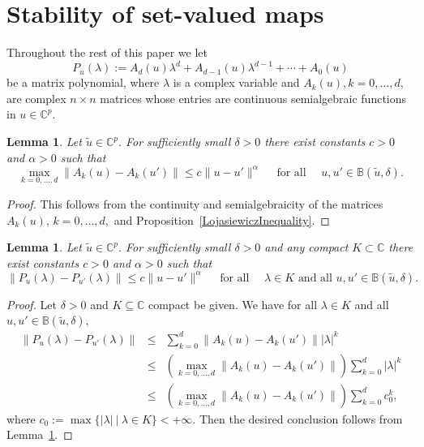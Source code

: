 \documentclass[10pt,reqno]{amsart}
\theoremstyle{break-italic}
\theoremstyle{break-italic}
\theoremstyle{break-italic}
\theoremstyle{break-italic}
\theoremstyle{break-italic}
\theoremstyle{break-italic}
\theoremstyle{break-italic}
\theoremstyle{break-italic}
\newtheorem{lemma}[satz]{Lemma}
\theoremstyle{break-roman}
\theoremstyle{standard}
\theoremstyle{varthm-roman}
\theoremstyle{varthm-italic}
\theoremstyle{varthm-roman-break}
\theoremstyle{varthm-italic-break}
\theoremstyle{varthm-roman-no-punctuation}
\theoremstyle{varthm-italic-no-punctuation}
\numberwithin{equation}{section}
\begin{document}
\section{Stability of set-valued maps} \label{Section-Stability}

Throughout the rest of this paper we let
$$P_{u}(\lambda) := A_d(u) \lambda^d  + A_{d - 1}(u) \lambda^{d - 1}  + \cdots + A_{0}(u)$$
be a matrix polynomial, where $\lambda$ is a complex variable and $A_{k}(u), k = 0, \ldots, d,$ are complex $n \times n$ matrices whose entries are continuous semialgebraic functions in $u \in \mathbb{C}^p.$

\begin{lemma}\label{Lemma31}
Let $\tilde{u} \in \mathbb{C}^p.$ For  sufficiently small $\delta > 0$ there exist constants $c > 0$ and $\alpha > 0$ such that
$$\max_{k = 0, \ldots, d} \|A_k(u) - A_k(u')\| \le c\|u - u'\|^\alpha \quad \mbox{ for all } \quad u, u' \in \mathbb{B}(\tilde{u}, \delta).$$
\end{lemma}

\begin{proof}
This follows from the continuity and semialgebraicity of the matrices $A_k(u)$, $k=0, \ldots, d,$ and Proposition~\ref{LojasiewiczInequality}.
\end{proof}

 \begin{lemma}\label{Lemma32}
Let $\tilde{u} \in \mathbb{C}^p.$ For  sufficiently small $\delta > 0$ and any compact $K \subset \mathbb{C}$ there exist constants $c > 0$ and $\alpha > 0$ such that
$$\| P_{u}(\lambda) - P_{u'}(\lambda) \| \le c \|u - u'\|^\alpha \quad \textrm{ for all } \quad
\lambda \in K \textrm{ and all } u, u' \in \mathbb{B}(\tilde{u}, \delta).$$
\end{lemma}
\begin{proof}
Let $\delta >0$ and $K \subseteq \mathbb C$ compact be given.  We have for all $\lambda \in K$ and all  $u, u' \in \mathbb{B}(\tilde{u}, \delta),$
\begin{eqnarray*}
\| P_{u}(\lambda) - P_{u'}(\lambda) \| & \le & \sum_{k = 0}^{d} \|A_k(u) - A_k(u')\| |\lambda|^k \\
& \le & \left( \max_{k = 0, \ldots, d} \|A_k(u) - A_k(u')\| \right) \sum_{k = 0}^{d} |\lambda|^k \\
& \le & \left( \max_{k = 0, \ldots, d} \|A_k(u) - A_k(u')\| \right) \sum_{k = 0}^{d} c_0^k,
\end{eqnarray*}
where $c_0 := \max  \{|\lambda| \ | \ {\lambda \in K}\} < + \infty.$ Then the desired conclusion follows from Lemma~\ref{Lemma31}.
\end{proof}
\end{document}

